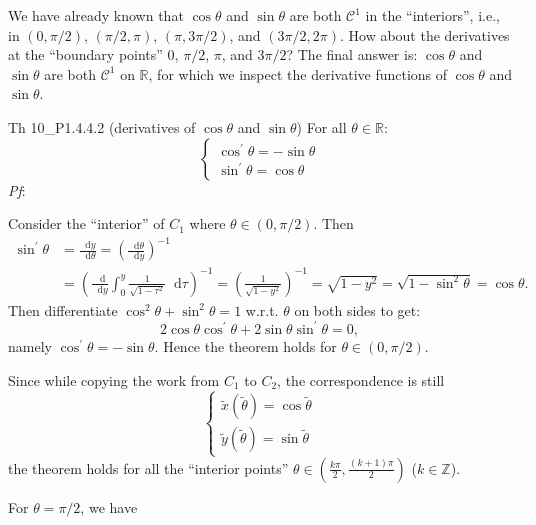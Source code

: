 \documentclass{article}
\newcommand{\dif}{\mathop{}\!\mathrm{d}}
\begin{document}
We have already known that $\cos \theta$ and $\sin \theta$ are both $\mathcal{C}^1$ in the ``interiors'', i.e., in $(0, \pi/2)$, $(\pi/2, \pi)$, $(\pi, 3\pi/2)$, and $(3\pi/2, 2\pi)$. How about the derivatives at the ``boundary points'' $0$, $\pi/2$, $\pi$, and $3\pi/2$? The final answer is: $\cos \theta$ and $\sin \theta$ are both $\mathcal{C}^1$ on $\mathbb{R}$, for which we inspect the derivative functions of $\cos \theta$ and $\sin \theta$.

\begin{Th}{Th 10\_P1.4.4.2 (derivatives of $\cos \theta$ and $\sin \theta$)}
    For all $\theta\in \mathbb{R}$:
    $$
    \begin{cases}
        \cos^\prime \theta = -\sin \theta \\
        \sin^\prime \theta = \cos \theta
    \end{cases}
    $$
    \tcblower
    \textit{Pf}: 
    \begin{compactenum}
        \item Consider the ``interior'' of $C_1$ where $\theta\in (0, \pi/2)$. Then 
        $$ 
        \begin{aligned}
            \sin^\prime \theta &= \frac{\dif y}{\dif \theta} = \left(\frac{\dif \theta}{\dif y}\right)^{-1} \\ 
            &= \left(\frac{\dif}{\dif y} \int_0^y \frac{1}{\sqrt{1-\tau^2}}\dif \tau\right)^{-1} = \left(\frac{1}{\sqrt{1-y^2}}\right)^{-1} = \sqrt{1-y^2} = \sqrt{1-\sin^2 \theta} = \cos \theta.
        \end{aligned}
        $$
        Then differentiate $\cos^2 \theta + \sin^2 \theta = 1$ w.r.t. $\theta$ on both sides to get:
        $$ 2\cos \theta \cos^\prime \theta + 2\sin \theta \sin^\prime \theta = 0, $$
        namely $\cos^\prime \theta = -\sin \theta$. Hence the theorem holds for $\theta\in (0, \pi/2)$. 
        \item Since while copying the work from $C_1$ to $C_2$, the correspondence is still
        $$ 
        \begin{cases}
            \tilde{x}(\tilde{\theta}) = \cos \tilde{\theta} \\
            \tilde{y}(\tilde{\theta}) = \sin \tilde{\theta}
        \end{cases}
        $$
        the theorem holds for all the ``interior points'' $\theta\in \left(\frac{k\pi}{2}, \frac{(k+1)\pi}{2}\right)$ ($k\in \mathbb{Z}$). 
        \item For $\theta = \pi/2$, we have
        $$ 
        \begin{aligned}

\end{aligned}$$
\end{compactenum}
\end{Th}
\end{document}
